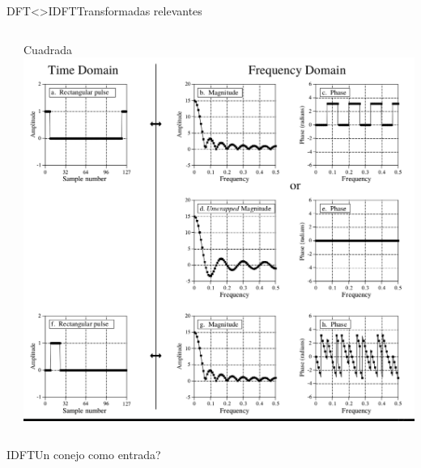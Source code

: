 \begin{frame}{DFT<>IDFT}{Transformadas relevantes}
\begin{columns}[c]
\begin{column}{.33\textwidth}
      \end{column}
      \begin{column}{.33\textwidth}
         Cuadrada
         \centering\includegraphics[width=1.0\textwidth]{4_clase/equivalencias_cuadrada}
      \end{column}
   \end{columns}
   \vfill
\end{frame}
\begin{frame}{IDFT}{Un conejo como entrada?}
   \handsonicon
   \begin{columns}[c]
      \hspace{2pt}
      \begin{column}{.5\textwidth}
         
      \end{column}
      \hspace{2pt}
      \vrule
      \hspace{2pt}
      \begin{column}{.5\textwidth}
         
      \end{column}
   \end{columns}
   \vfill
\end{frame}
